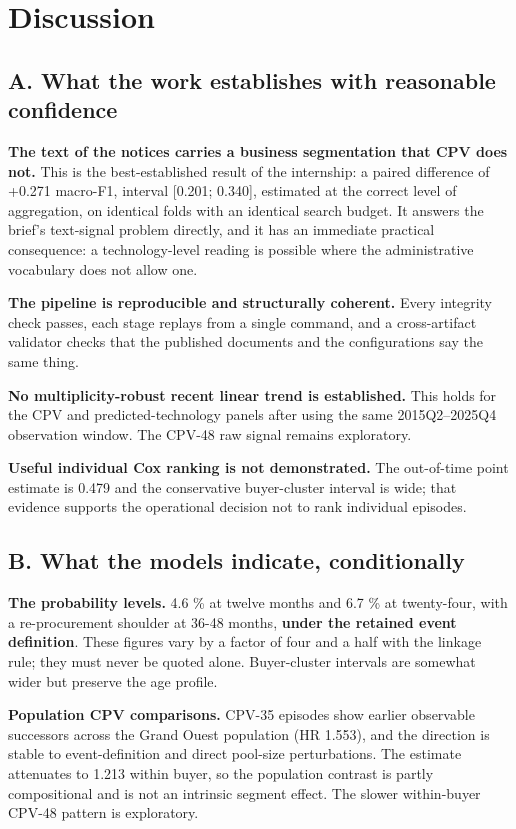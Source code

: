 \section{Discussion}

\subsection{A. What the work establishes with reasonable confidence}

\textbf{The text of the notices carries a business segmentation that CPV does not.} This is the best-established result of the internship: a paired difference of +0.271 macro-F1, interval {[}0.201; 0.340{]}, estimated at the correct level of aggregation, on identical folds with an identical search budget. It answers the brief's text-signal problem directly, and it has an immediate practical consequence: a technology-level reading is possible where the administrative vocabulary does not allow one.

\textbf{The pipeline is reproducible and structurally coherent.} Every integrity check passes, each stage replays from a single command, and a cross-artifact validator checks that the published documents and the configurations say the same thing.

\textbf{No multiplicity-robust recent linear trend is established.} This holds for the CPV and predicted-technology panels after using the same 2015Q2--2025Q4 observation window. The CPV-48 raw signal remains exploratory.

\textbf{Useful individual Cox ranking is not demonstrated.} The out-of-time point estimate is 0.479 and the conservative buyer-cluster interval is wide; that evidence supports the operational decision not to rank individual episodes.

\subsection{B. What the models indicate, conditionally}

\textbf{The probability levels.} 4.6 \% at twelve months and 6.7 \% at twenty-four, with a re-procurement shoulder at 36-48 months, \textbf{under the retained event definition}. These figures vary by a factor of four and a half with the linkage rule; they must never be quoted alone. Buyer-cluster intervals are somewhat wider but preserve the age profile.

\textbf{Population CPV comparisons.} CPV-35 episodes show earlier observable successors across the Grand Ouest population (HR 1.553), and the direction is stable to event-definition and direct pool-size perturbations. The estimate attenuates to 1.213 within buyer, so the population contrast is partly compositional and is not an intrinsic segment effect. The slower within-buyer CPV-48 pattern is exploratory.


